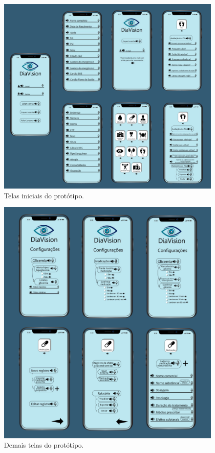 \begin{figure}[htb]
    \caption{\label{fig_tel_ini_prot}Telas iniciais do protótipo.}
    \begin{center}
        \includegraphics[scale=0.57]{Imagens/proposta/telas_iniciais_prot.png}
    \end{center}
\end{figure}

\begin{figure}[htb]
    \caption{\label{fig_tel_pos_prot}Demais telas do protótipo.}
    \begin{center}
        \includegraphics[scale=0.45]{Imagens/proposta/telas_post_prot.png}
    \end{center}
\end{figure}

